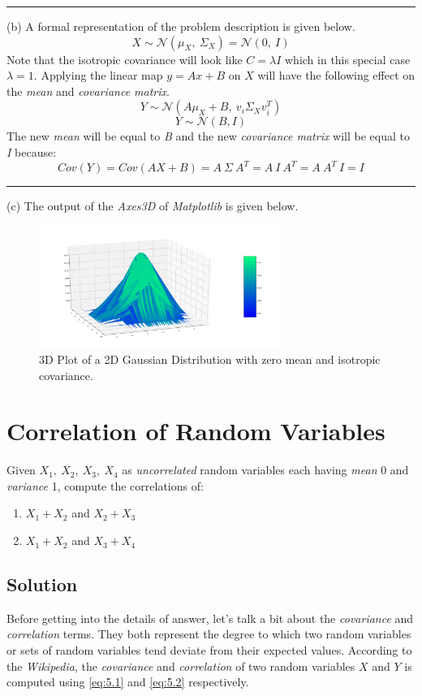 \documentclass[12pt]{article}
\numberwithin{equation}{section}
\numberwithin{table}{section}
\numberwithin{figure}{section}
\begin{document}
\noindent\rule{\textwidth}{.5pt}
(b) A formal representation of the problem description is given below.
$$
	X \sim \mathcal{N}(\mu_X, \ \Sigma_X) = \mathcal{N}(0, \ I)
$$
Note that the isotropic covariance will look like $C=\lambda I$ which in this special case $\lambda = 1$. Applying the linear map $y = Ax + B$ on $X$ will have the following effect on the \textit{mean} and \textit{covariance matrix}.
$$
	Y \sim \mathcal{N}(A\mu_X + B, \ v_i \Sigma_X v_i^T)
$$
$$
	Y \sim \mathcal{N}(B, I)
$$
The new \textit{mean} will be equal to \textit{B} and the new \textit{covariance matrix} will be equal to \textit{I} because:
$$
	Cov(Y) = Cov(AX + B) = A\ \Sigma \ A^T = A\ I\ A^T = A\ A^T\ I = I
$$
\noindent\rule{\textwidth}{.5pt}
(c) The output of the \textit{Axes3D} of \textit{Matplotlib} is given below.
\begin{figure}[!h]\centering
	\includegraphics[width=0.7\textwidth]{multivariate_normal.png}
	\caption{3D Plot of a 2D Gaussian Distribution with zero mean and isotropic covariance.}
	\label{figsolplot}
\end{figure}

\section{Correlation of Random Variables}
Given $X_1,\ X_2,\ X_3,\ X_4$ as \textit{uncorrelated} random variables each having \textit{mean} 0 and \textit{variance} 1, compute the correlations of:\\
\begin{enumerate}[label=(\alph*)]
	\item $X_1 + X_2$ and $X_2 + X_3$
	
	\item $X_1 + X_2$ and $X_3 + X_4$
\end{enumerate}

\subsection*{Solution}
Before getting into the details of answer, let's talk a bit about the \textit{covariance} and \textit{correlation} terms. They both represent the degree to which two random variables or sets of random variables tend deviate from their expected values. According to the \textit{Wikipedia}, the \textit{covariance} and \textit{correlation} of two random variables $X$ and $Y$ is computed using \ref{eq:5.1} and \ref{eq:5.2} respectively.
\end{document}
